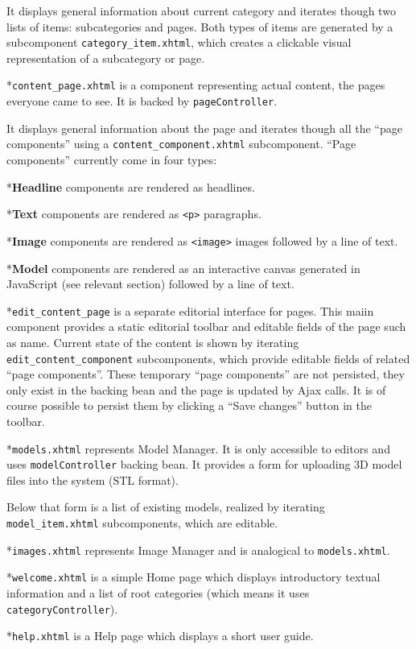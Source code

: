 It displays general information about current category and iterates though two lists of items: subcategories and pages. Both types of items are generated by a subcomponent {\tt category\_item.xhtml}, which creates a clickable visual representation of a subcategory or page.

*{\tt content\_page.xhtml} is a component representing actual content, the pages everyone came to see. It is backed by {\tt pageController}.

It displays general information about the page and iterates though all the “page components” using a {\tt content\_component.xhtml} subcomponent. “Page components” currently come in four types:

\begitems

*{\bf Headline} components are rendered as {\tt <h3>} headlines.

*{\bf Text} components are rendered as {\tt <p>} paragraphs.

*{\bf Image} components are rendered as {\tt <image>} images followed by a line of text.

*{\bf Model} components are rendered as an interactive canvas generated in JavaScript (see relevant section) followed by a line of text.

\enditems

*{\tt edit\_content\_page} is a separate editorial interface for pages. This maiin component provides a static editorial toolbar and editable fields of the page such as name. Current state of the content is shown by iterating {\tt edit\_content\_component} subcomponents, which provide editable fields of related “page components”. These temporary “page components” are not persisted, they only exist in the backing bean and the page is updated by Ajax calls. It is of course possible to persist them by clicking a “Save changes” button in the toolbar.

*{\tt models.xhtml} represents Model Manager. It is only accessible to editors and uses {\tt modelController} backing bean.
It provides a form for uploading 3D model files into the system (STL format).

Below that form is a list of existing models, realized by iterating {\tt model\_item.xhtml} subcomponents, which are editable.

*{\tt images.xhtml} represents Image Manager and is analogical to {\tt models.xhtml}.

*{\tt welcome.xhtml} is a simple Home page which displays introductory textual information and a list of root categories (which means it uses {\tt categoryController}).

*{\tt help.xhtml} is a Help page which displays a short user guide.

\enditems
